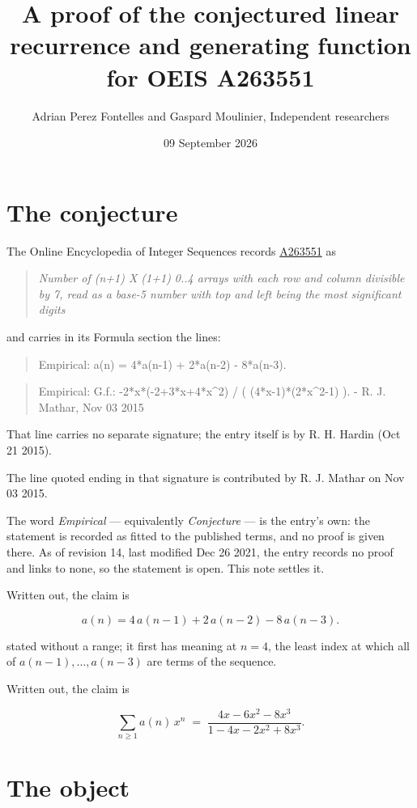 \documentclass[11pt]{article}
\title{A proof of the conjectured linear recurrence and generating function for OEIS A263551}
\author{Adrian Perez Fontelles and Gaspard Moulinier, Independent researchers}
\date{09 September 2026}
\theoremstyle{definition}
\begin{document}
\maketitle
\section{The conjecture}

The Online Encyclopedia of Integer Sequences records \href{https://oeis.org/A263551}{A263551} as

\begin{quote}\itshape Number of (n+1) X (1+1) 0..4 arrays with each row and column divisible by 7, read as a base-5 number with top and left being the most significant digits\end{quote}

and carries in its Formula section the lines:

\begin{quote}\ttfamily Empirical: a(n) = 4*a(n-1) + 2*a(n-2) - 8*a(n-3).\end{quote}

\begin{quote}\ttfamily Empirical: G.f.: -2*x*(-2+3*x+4*x\textasciicircum{}2) / ( (4*x-1)*(2*x\textasciicircum{}2-1) ). - R. J. Mathar, Nov 03 2015\end{quote}

That line carries no separate signature; the entry itself is by R. H. Hardin (Oct 21 2015).

The line quoted ending in that signature is contributed by R. J. Mathar on Nov 03 2015.

The word {\itshape Empirical} --- equivalently {\itshape Conjecture} --- is the entry's own: the statement is recorded as fitted to the published terms, and no proof is given there. As of revision 14, last modified Dec 26 2021, the entry records no proof and links to none, so the statement is open. This note settles it.

Written out, the claim is

\[a(n) = 4\,a(n-1) + 2\,a(n-2) - 8\,a(n-3).\]

stated without a range; it first has meaning at $n = 4$, the least index at which all of $a(n-1),\dots,a(n-3)$ are terms of the sequence.

Written out, the claim is

\[\sum_{n \ge 1} a(n)\,x^n \;=\; \frac{4x - 6x^{2} - 8x^{3}}{1 - 4x - 2x^{2} + 8x^{3}}.\]

\section{The object}
\end{document}
